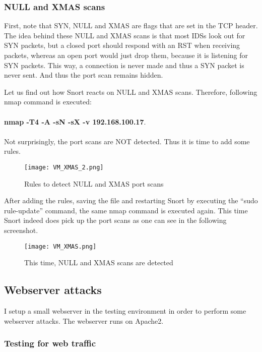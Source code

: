 \subsubsection{NULL and XMAS scans}

First, note that SYN, NULL and XMAS are flags that are set in the TCP header. The idea behind these NULL and XMAS scans is that most IDSs look out for SYN packets, but a closed port should respond with an RST when receiving packets, whereas an open port would just drop them, because it is listening for SYN packets. This way, a connection is never made and thus a SYN packet is never sent. And thus the port scan remains hidden.

Let us find out how Snort reacts on NULL and XMAS scans. Therefore, following nmap command is executed: \\ \\
\textbf{nmap -T4 -A -sN -sX -v 192.168.100.17}. \\ \\
Not surprisingly, the port scans are NOT detected. Thus it is time to add some rules.

\begin{figure}[h]
    \centering
    \texttt{[image: VM\_XMAS\_2.png]}
    \caption{Rules to detect NULL and XMAS port scans}
\end{figure}

After adding the rules, saving the file and restarting Snort by executing the ``sudo rule-update'' command, the same nmap command is executed again. This time Snort indeed does pick up the port scans as one can see in the following screenshot.

\begin{figure}[h]
    \centering
    \texttt{[image: VM\_XMAS.png]}
    \caption{This time, NULL and XMAS scans are detected}
\end{figure}

\clearpage

\subsection{Webserver attacks}

I setup a small webserver in the testing environment in order to perform some webserver attacks. The webserver runs on Apache2. 

\subsubsection{Testing for web traffic}

